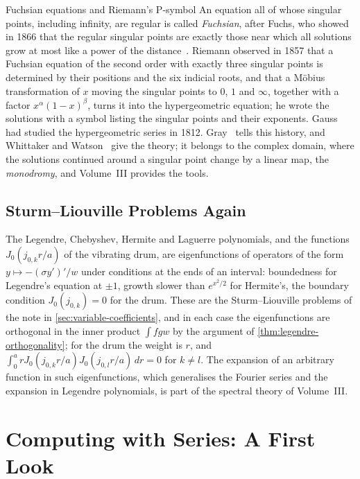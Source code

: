 \begin{note}{Fuchsian equations and Riemann's P-symbol}
An equation all of whose singular points, including infinity, are regular is called \emph{Fuchsian}, after Fuchs, who showed in 1866 that the regular singular points are exactly those near which all solutions grow at most like a power of the distance~\cite{fuchs1866}. Riemann observed in 1857 that a Fuchsian equation of the second order with exactly three singular points is determined by their positions and the six indicial roots, and that a M\"obius transformation of $x$ moving the singular points to $0$, $1$ and $\infty$, together with a factor $x^\alpha(1-x)^\beta$, turns it into the hypergeometric equation; he wrote the solutions with a symbol listing the singular points and their exponents. Gauss had studied the hypergeometric series in 1812. Gray~\cite{gray2000} tells this history, and Whittaker and Watson~\cite[Chaps.~X and~XIV]{whittaker1927} give the theory; it belongs to the complex domain, where the solutions continued around a singular point change by a linear map, the \emph{monodromy}, and Volume~III provides the tools.
\end{note}

\subsection{Sturm--Liouville Problems Again}

The Legendre, Chebyshev, Hermite and Laguerre polynomials, and the functions $J_0(j_{0,k}r/a)$ of the vibrating drum, are eigenfunctions of operators of the form $y\mapsto-(\sigma y')'/w$ under conditions at the ends of an interval: boundedness for Legendre's equation at $\pm1$, growth slower than $e^{x^2/2}$ for Hermite's, the boundary condition $J_0(j_{0,k})=0$ for the drum. These are the Sturm--Liouville problems of the note in \cref{sec:variable-coefficients}, and in each case the eigenfunctions are orthogonal in the inner product $\int fgw$ by the argument of \cref{thm:legendre-orthogonality}; for the drum the weight is $r$, and $\int_0^arJ_0(j_{0,k}r/a)J_0(j_{0,l}r/a)\,dr=0$ for $k\ne l$. The expansion of an arbitrary function in such eigenfunctions, which generalises the Fourier series and the expansion in Legendre polynomials, is part of the spectral theory of Volume~III.

\section{Computing with Series: A First Look}
\label{sec:series-computation}

